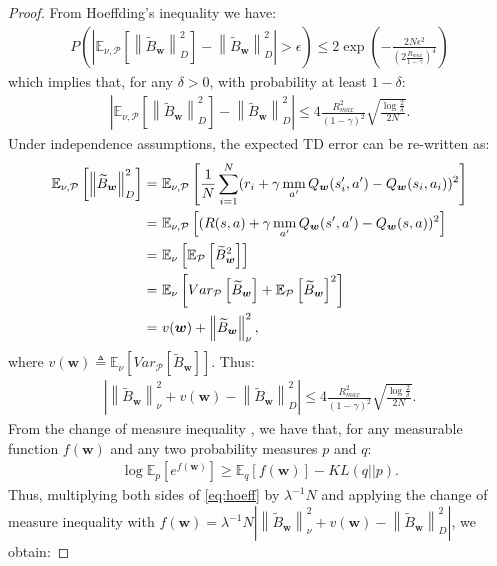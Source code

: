 \documentclass{article}
\newcommand{\mm}{\operatornamewithlimits{mm}}
\newcommand{\wt}[1]{\widetilde{#1}}
\newcommand{\norm}[1]{\left\lVert #1 \right\rVert}
\newcommand{\abs}[1]{\left\lvert #1 \right\rvert}
\begin{document}
\begin{proof}
From Hoeffding's inequality we have:
\begin{align*}
P\left( \abs{\mathbb{E}_{\nu,\mathcal{P}}\left[\norm{\wt B_{\bm{w}}}_D^2\right] - \norm{\wt B_{\bm{w}}}_D^2} > \epsilon \right) \leq 2\exp\left( -\frac{2N\epsilon^2}{\left(2\frac{R_{max}}{1-\gamma}\right)^4} \right)
\end{align*}
which implies that, for any $\delta>0$, with probability at least $1-\delta$:
\begin{align*}
\abs{\mathbb{E}_{\nu,\mathcal{P}}\left[\norm{\wt B_{\bm{w}}}_D^2\right] - \norm{\wt B_{\bm{w}}}_D^2} \leq 4\frac{R_{max}^2}{(1-\gamma)^2}\sqrt{\frac{\log\frac{2}{\delta}}{2N}}.
\end{align*}
Under independence assumptions, the expected TD error can be re-written as:
\begin{align*}
\mathbb{E}_{\nu,\mathcal{P}}\left[\norm{\wt B_{\bm{w}}}_D^2\right] =\ & \mathbb{E}_{\nu,\mathcal{P}}\left[\frac{1}{N}\sum_{i=1}^N (r_i + \gamma \mm_{a'} Q_{\bm{w}}(s_i',a') - Q_{\bm{w}}(s_i,a_i))^2\right]\\ =\ & \mathbb{E}_{\nu,\mathcal{P}}\left[(R(s,a) + \gamma \mm_{a'} Q_{\bm{w}}(s',a') - Q_{\bm{w}}(s,a))^2\right]\\ =\ & \mathbb{E}_{\nu}\left[\mathbb{E}_{\mathcal{P}}\left[\wt B_{\bm{w}}^2\right]\right]\\ =\ & \mathbb{E}_{\nu}\left[Var_{\mathcal{P}}\left[\wt B_{\bm{w}}\right] + \mathbb{E}_{\mathcal{P}}\left[\wt B_{\bm{w}}\right]^2\right]\\ =\ & v(\bm{w}) + \norm{\wt B_{\bm{w}}}_{\nu}^2,
\end{align*}
where $v(\bm{w}) \triangleq \mathbb{E}_{\nu}\left[Var_{\mathcal{P}}\left[\wt B_{\bm{w}}\right]\right]$. Thus:
\begin{align}\label{eq:hoeff}
\abs{\norm{\wt B_{\bm{w}}}_{\nu}^2 + v(\bm{w}) - \norm{\wt B_{\bm{w}}}_D^2} \leq 4\frac{R_{max}^2}{(1-\gamma)^2}\sqrt{\frac{\log\frac{2}{\delta}}{2N}}.
\end{align}
From the change of measure inequality \cite{seldin2012pac}, we have that, for any measurable function $f(\bm{w})$ and any two probability measures $p$ and $q$:
\begin{align*}
\log\mathbb{E}_p\left[e^{f(\bm{w})}\right] \geq \mathbb{E}_q\left[ f(\bm{w}) \right] - KL(q||p).
\end{align*}
Thus, multiplying both sides of \eqref{eq:hoeff} by $\lambda^{-1}N$ and applying the change of measure inequality with $f(\bm{w}) = \lambda^{-1}N\abs{\norm{\wt B_{\bm{w}}}_{\nu}^2 + v(\bm{w}) - \norm{\wt B_{\bm{w}}}_D^2}$, we obtain:

\end{proof}
\end{document}
